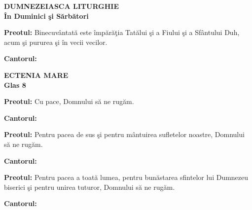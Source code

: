 \documentclass[12pt]{book}
\begin{document}
  
  \begin{center}
    {\LARGE \bf DUMNEZEIASCA LITURGHIE\\
      \vspace{0.1in}
      \^{I}n Duminici \c{s}i S\u{a}rb\u{a}tori}
  \end{center}

  \vspace{0.3in}

  {\bf Preotul:} Binecuv\^{a}ntat\u{a} este \^{i}mp\u{a}r\u{a}\c{t}ia
  Tat\u{a}lui \c{s}i a Fiului \c{s}i a Sf\^{a}ntului Duh, acum \c{s}i
  pururea \c{s}i \^{i}n vecii vecilor.

  {\bf Cantorul:}
  \begin{figure}[h]
    \begin{center}
    \end{center}
  \end{figure}

  \begin{center}
    {\large \bf ECTENIA MARE\\
      Glas 8}
  \end{center}

  {\bf Preotul:} Cu pace, Domnului s\u{a} ne rug\u{a}m.

  {\bf Cantorul:}
  \begin{figure}[h]
    \begin{center}
    \end{center}
  \end{figure}

  \pagebreak
  \pagestyle{myheadings} \markright{\hfill \small } \setcounter{page}{2}

  {\bf Preotul:} Pentru pacea de sus \c{s}i pentru m\^{a}ntuirea
  sufletelor noastre, Domnului s\u{a} ne rug\u{a}m.

  {\bf Cantorul:}
  \begin{figure}[h]
    \begin{center}
    \end{center}
  \end{figure}

  {\bf Preotul:} Pentru pacea a toat\u{a} lumea, pentru bun\u{a}starea
  sfintelor lui Dumnezeu biserici \c{s}i pentru unirea tuturor,
  Domnului s\u{a} ne rug\u{a}m.

  {\bf Cantorul:}
  \begin{figure}[h]
    \begin{center}
    \end{center}
  \end{figure}
\end{document}
